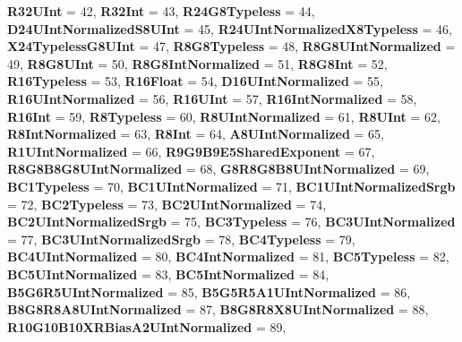 \begin{DoxyCompactItemize}
{\bfseries R32\+U\+Int} = 42, 
{\bfseries R32\+Int} = 43, 
\newline
{\bfseries R24\+G8\+Typeless} = 44, 
{\bfseries D24\+U\+Int\+Normalized\+S8\+U\+Int} = 45, 
{\bfseries R24\+U\+Int\+Normalized\+X8\+Typeless} = 46, 
{\bfseries X24\+Typeless\+G8\+U\+Int} = 47, 
\newline
{\bfseries R8\+G8\+Typeless} = 48, 
{\bfseries R8\+G8\+U\+Int\+Normalized} = 49, 
{\bfseries R8\+G8\+U\+Int} = 50, 
{\bfseries R8\+G8\+Int\+Normalized} = 51, 
\newline
{\bfseries R8\+G8\+Int} = 52, 
{\bfseries R16\+Typeless} = 53, 
{\bfseries R16\+Float} = 54, 
{\bfseries D16\+U\+Int\+Normalized} = 55, 
\newline
{\bfseries R16\+U\+Int\+Normalized} = 56, 
{\bfseries R16\+U\+Int} = 57, 
{\bfseries R16\+Int\+Normalized} = 58, 
{\bfseries R16\+Int} = 59, 
\newline
{\bfseries R8\+Typeless} = 60, 
{\bfseries R8\+U\+Int\+Normalized} = 61, 
{\bfseries R8\+U\+Int} = 62, 
{\bfseries R8\+Int\+Normalized} = 63, 
\newline
{\bfseries R8\+Int} = 64, 
{\bfseries A8\+U\+Int\+Normalized} = 65, 
{\bfseries R1\+U\+Int\+Normalized} = 66, 
{\bfseries R9\+G9\+B9\+E5\+Shared\+Exponent} = 67, 
\newline
{\bfseries R8\+G8\+B8\+G8\+U\+Int\+Normalized} = 68, 
{\bfseries G8\+R8\+G8\+B8\+U\+Int\+Normalized} = 69, 
{\bfseries B\+C1\+Typeless} = 70, 
{\bfseries B\+C1\+U\+Int\+Normalized} = 71, 
\newline
{\bfseries B\+C1\+U\+Int\+Normalized\+Srgb} = 72, 
{\bfseries B\+C2\+Typeless} = 73, 
{\bfseries B\+C2\+U\+Int\+Normalized} = 74, 
{\bfseries B\+C2\+U\+Int\+Normalized\+Srgb} = 75, 
\newline
{\bfseries B\+C3\+Typeless} = 76, 
{\bfseries B\+C3\+U\+Int\+Normalized} = 77, 
{\bfseries B\+C3\+U\+Int\+Normalized\+Srgb} = 78, 
{\bfseries B\+C4\+Typeless} = 79, 
\newline
{\bfseries B\+C4\+U\+Int\+Normalized} = 80, 
{\bfseries B\+C4\+Int\+Normalized} = 81, 
{\bfseries B\+C5\+Typeless} = 82, 
{\bfseries B\+C5\+U\+Int\+Normalized} = 83, 
\newline
{\bfseries B\+C5\+Int\+Normalized} = 84, 
{\bfseries B5\+G6\+R5\+U\+Int\+Normalized} = 85, 
{\bfseries B5\+G5\+R5\+A1\+U\+Int\+Normalized} = 86, 
{\bfseries B8\+G8\+R8\+A8\+U\+Int\+Normalized} = 87, 
\newline
{\bfseries B8\+G8\+R8\+X8\+U\+Int\+Normalized} = 88, 
{\bfseries R10\+G10\+B10\+X\+R\+Bias\+A2\+U\+Int\+Normalized} = 89, 

\end{DoxyCompactItemize}
